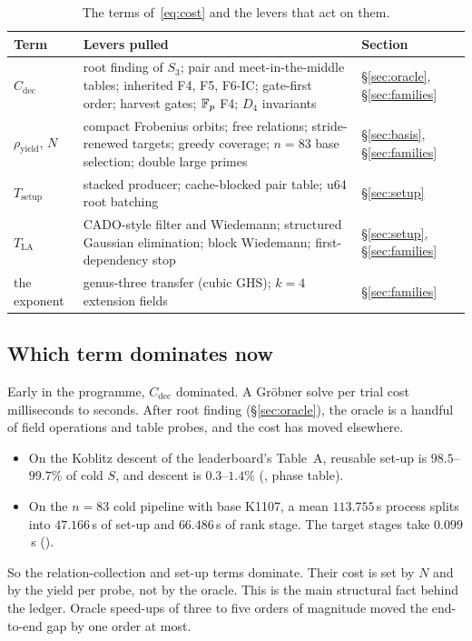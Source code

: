 \begin{table}[t]
\centering\small
\caption[]{The terms of~\eqref{eq:cost} and the levers that act on them.}
\label{tab:levers}
\begin{tabularx}{\linewidth}{@{}l>{\raggedright}X>{\raggedright\arraybackslash}p{2.6cm}@{}}
\toprule
Term & Levers pulled & Section \\
\midrule
$C_{\mathrm{dec}}$ & root finding of $S_3$; pair and meet-in-the-middle
  tables; inherited F4, F5, F6-IC; gate-first order; harvest gates;
  $\mathbb{F}_p$ F4; $D_4$ invariants & \S\ref{sec:oracle}, \S\ref{sec:families} \\
$\rho_{\mathrm{yield}}$, $N$ & compact Frobenius orbits; free relations;
  stride-renewed targets; greedy coverage; $n=83$ base selection; double
  large primes & \S\ref{sec:basis}, \S\ref{sec:families} \\
$T_{\mathrm{setup}}$ & stacked producer; cache-blocked pair table; u64 root
  batching & \S\ref{sec:setup} \\
$T_{\mathrm{LA}}$ & CADO-style filter and Wiedemann; structured Gaussian
  elimination; block Wiedemann; first-dependency stop & \S\ref{sec:setup},
  \S\ref{sec:families} \\
the exponent & genus-three transfer (cubic GHS); $k=4$ extension fields &
  \S\ref{sec:families} \\
\bottomrule
\end{tabularx}
\end{table}

\subsection{Which term dominates now}

Early in the programme, $C_{\mathrm{dec}}$ dominated. A Gr\"obner solve per
trial cost milliseconds to seconds. After root finding
(\S\ref{sec:oracle}), the oracle is a handful of field operations and table
probes, and the cost has moved elsewhere.
\begin{itemize}
\item On the Koblitz descent of the leaderboard's Table~A, reusable set-up
  is $98.5$--$99.7\%$ of cold $S$, and descent is $0.3$--$1.4\%$
  (, phase table).
\item On the $n=83$ cold pipeline with base K1107, a mean $113.755$\,s
  process splits into $47.166$\,s of set-up and $66.486$\,s of rank stage.
  The target stages take $0.099$\,s
  ().
\end{itemize}
So the relation-collection and set-up terms dominate. Their cost is set by
$N$ and by the yield per probe, not by the oracle. This is the main
structural fact behind the ledger. Oracle speed-ups of three to five orders
of magnitude moved the end-to-end gap by one order at most.
